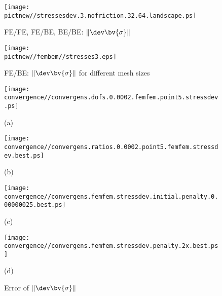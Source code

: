 \begin{figure} [h]
\begin{minipage}[c]{8.5cm}
\texttt{[image: \\pictnew//stressesdev.3.nofriction.32.64.landscape.ps]}
\caption{ \label{fig:ElPlContEx1ffbbforce}  FE/FE, FE/BE, BE/BE: $\|\dev \bv{\sigma}\|$ }
\end{minipage}
\begin{minipage}[c]{7.5cm}
\texttt{[image: \\pictnew//fembem//stresses3.eps]}
\caption{ \label{fig:ElPlContEx1h}  FE/BE: $\|\dev \bv{\sigma}\|$ for different mesh sizes }
\end{minipage}
\end{figure}

\begin{figure} [h]
\begin{minipage}[c]{8.5cm}
  \texttt{[image: \\convergence//convergens.dofs.0.0002.femfem.point5.stressdev.ps]}

\begin{center}
(a)\end{center}
\end{minipage}
\begin{minipage}[c]{7.5cm}
  \texttt{[image: \\convergence//convergens.ratios.0.0002.point5.femfem.stressdev.best.ps]}


\begin{center}
(b)\end{center}
\end{minipage}

\begin{minipage}[c]{8.5cm}
\texttt{[image: \\convergence//convergens.femfem.stressdev.initial.penalty.0.00000025.best.ps]}

\begin{center}
(c)\end{center}
\end{minipage}
\begin{minipage}[c]{7.5cm}
\texttt{[image: \\convergence//convergens.femfem.stressdev.penalty.2x.best.ps]}

\begin{center}
(d)\end{center}
\end{minipage}

\caption{ \label{fig:ElPlContExFEMFEMstressdev}  Error of  $\|\dev \bv{\sigma}\|$ }
\end{figure}


